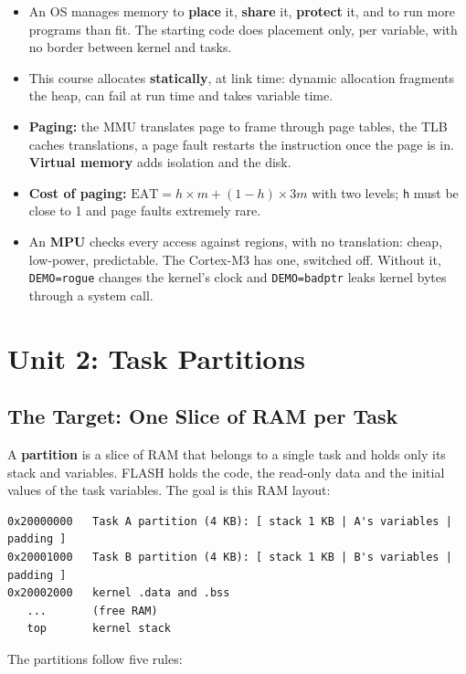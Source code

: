 \begin{itemize}
    \item An OS manages memory to \textbf{place} it, \textbf{share} it, \textbf{protect} it, and to run more programs than fit. The starting code does placement only, per variable, with no border between kernel and tasks.
    \item This course allocates \textbf{statically}, at link time: dynamic allocation fragments the heap, can fail at run time and takes variable time.
    \item \textbf{Paging:} the MMU translates page to frame through page tables, the TLB caches translations, a page fault restarts the instruction once the page is in. \textbf{Virtual memory} adds isolation and the disk.
    \item \textbf{Cost of paging:} $\text{EAT} = h \times m + (1 - h) \times 3m$ with two levels; \texttt{h} must be close to 1 and page faults extremely rare.
    \item An \textbf{MPU} checks every access against regions, with no translation: cheap, low-power, predictable. The Cortex-M3 has one, switched off. Without it, \texttt{DEMO=rogue} changes the kernel's clock and \texttt{DEMO=badptr} leaks kernel bytes through a system call.
\end{itemize}


\section{Unit 2: Task Partitions}

\subsection{The Target: One Slice of RAM per Task}

A \textbf{partition} is a slice of RAM that belongs to a single task and holds only its stack and variables. FLASH holds the code, the read-only data and the initial values of the task variables. The goal is this RAM layout:

\begin{lstlisting}
0x20000000   Task A partition (4 KB): [ stack 1 KB | A's variables | padding ]
0x20001000   Task B partition (4 KB): [ stack 1 KB | B's variables | padding ]
0x20002000   kernel .data and .bss
   ...       (free RAM)
   top       kernel stack
\end{lstlisting}

The partitions follow five rules:

